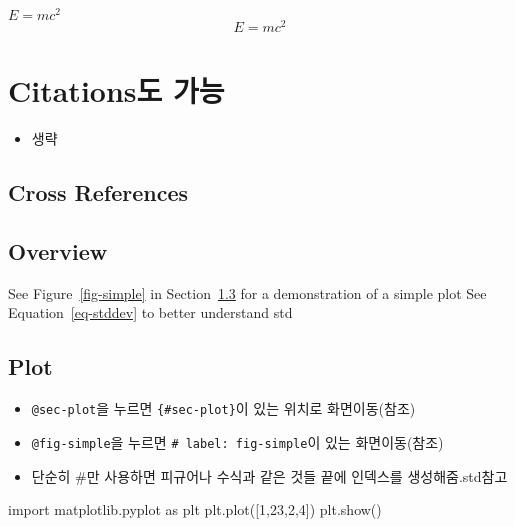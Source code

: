 \documentclass[
  letterpaper,
  DIV=11,
  numbers=noendperiod]{scrartcl}
\newenvironment{Shaded}{\begin{snugshade}}{\end{snugshade}}
\newcommand{\DecValTok}[1]{\textcolor[rgb]{0.68,0.00,0.00}{#1}}
\newcommand{\ImportTok}[1]{\textcolor[rgb]{0.00,0.46,0.62}{#1}}
\newcommand{\NormalTok}[1]{\textcolor[rgb]{0.00,0.23,0.31}{#1}}
\providecommand{\tightlist}{%
  \setlength{\itemsep}{0pt}\setlength{\parskip}{0pt}}\usepackage{longtable,booktabs,array}
\begin{document}
\(E = mc^{2}\) \[E = mc^{2}\]

\hypertarget{citationsuxb3c4-uxac00uxb2a5}{%
\section{Citations도 가능}\label{citationsuxb3c4-uxac00uxb2a5}}

\begin{itemize}
\tightlist
\item
  생략
\end{itemize}

\hypertarget{cross-references}{%
\subsection{Cross References}\label{cross-references}}

\hypertarget{overview}{%
\subsection{Overview}\label{overview}}

See Figure~\ref{fig-simple} in Section~\ref{sec-plot} for a
demonstration of a simple plot See Equation~\ref{eq-stddev} to better
understand std

\hypertarget{sec-plot}{%
\subsection{Plot}\label{sec-plot}}

\begin{itemize}
\tightlist
\item
  \texttt{@sec-plot}을 누르면 \texttt{\{\#sec-plot\}}이 있는 위치로
  화면이동(참조)
\item
  \texttt{@fig-simple}을 누르면
  \texttt{\#\textbar{}\ label:\ fig-simple}이 있는 화면이동(참조)
\item
  단순히 \#만 사용하면 피규어나 수식과 같은 것들 끝에 인덱스를
  생성해줌.std참고
\end{itemize}

\begin{Shaded}
\begin{Highlighting}[]
\ImportTok{import}\NormalTok{ matplotlib.pyplot }\ImportTok{as}\NormalTok{ plt}
\NormalTok{plt.plot([}\DecValTok{1}\NormalTok{,}\DecValTok{23}\NormalTok{,}\DecValTok{2}\NormalTok{,}\DecValTok{4}\NormalTok{])}
\NormalTok{plt.show()}
\end{Highlighting}
\end{Shaded}
\end{document}
